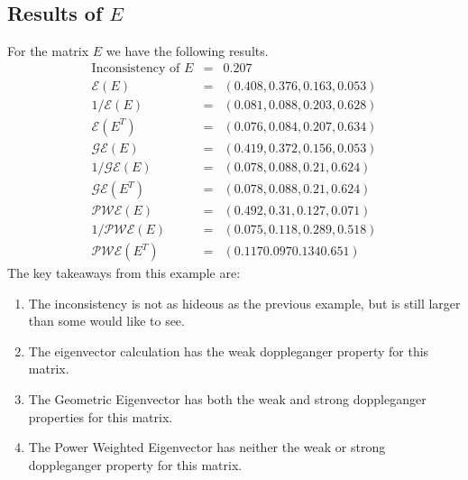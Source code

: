 \documentclass[11pt]{article}
\begin{document}
\subsection{Results of $E$}
For the matrix $E$ we have the following results.
\begin{eqnarray*}
	\mbox{Inconsistency of } E &=& 0.207 \\
	\mathcal{E}(E) &=& ( 0.408,  0.376,  0.163,  0.053) \\
	1/\mathcal{E}(E) &=& ( 0.081,  0.088,  0.203,  0.628) \\
	\mathcal{E}(E^T) &=& ( 0.076,  0.084,  0.207,  0.634) \\
	\mathcal{GE}(E) &=& (  0.419,  0.372,  0.156,  0.053) \\
	1/\mathcal{GE}(E) &=& (  0.078,  0.088,  0.21,   0.624) \\
	\mathcal{GE}(E^T) &=& (  0.078,  0.088,  0.21,   0.624) \\
	\mathcal{PWE}(E) &=& ( 0.492,  0.31,   0.127,  0.071) \\
	1/\mathcal{PWE}(E) &=& ( 0.075,  0.118,  0.289,  0.518) \\
	\mathcal{PWE}(E^T) &=& ( 0.117  0.097  0.134  0.651)
\end{eqnarray*}
The key takeaways from this example are:
\begin{enumerate}
	\item The inconsistency is not as hideous as the previous example, but is still larger than some would like to see.
	\item The eigenvector calculation has the weak doppleganger property for this matrix.
	\item The Geometric Eigenvector has both the weak and strong doppleganger properties for this matrix.
	\item  The Power Weighted Eigenvector  has neither the weak or strong doppleganger property for this matrix.
\end{enumerate}
\end{document}
